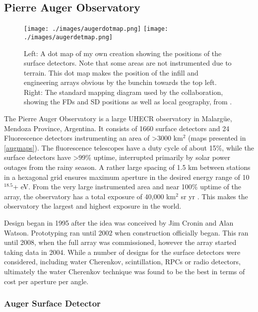 \subsection{Pierre Auger Observatory}
\label{auger}
\begin{figure}[h!]
\begin{center}
\texttt{[image: ./images/augerdotmap.png]}
\texttt{[image: ./images/augerdetmap.png]}
\caption[Maps of Auger]{Left: A dot map of my own creation showing the positions of the surface detectors. Note that some areas are not instrumented due to terrain. This dot map makes the position of the infill and engineering arrays obvious by the bunchin towards the top left. Right: The standard mapping diagram used by the collaboration, showing the FDs and SD positions as well as local geography, from \cite{auger2015}.}
\label{augmaps}
\end{center}
\end{figure}
The Pierre Auger Observatory is a large UHECR observatory in Malarg\"{u}e, Mendoza Province, Argentina. It consists of 1660 surface detectors and 24 Fluorescence detectors instrumenting an area of \textgreater 3000 km$^2$ (maps presented in \autoref{augmaps}). The fluorescence telescopes have a duty cycle of about 15\%, while the surface detectors have \textgreater 99\% uptime, interrupted primarily by solar power outages from the rainy season. A rather large spacing of 1.5 km between stations in a hexagonal grid ensures maximum aperture in the desired energy range of 10$^{18.5}$+ eV. From the very large instrumented area and near 100\% uptime of the array, the observatory has a total exposure of 40,000 km$^2$ sr yr \cite{auger2015}. This makes the observatory the largest and highest exposure in the world.

Design began in 1995 after the idea was conceived by Jim Cronin and Alan Watson. Prototyping ran until 2002 when construction officially began. This ran until 2008, when the full array was commissioned, however the array started taking data in 2004. While a number of designs for the surface detectors were considered, including water Cherenkov, scintillation, RPCs or radio detectors, 
ultimately the water Cherenkov technique was found to be the best in terms of cost per aperture per angle. 

\subsubsection{Auger Surface Detector}

